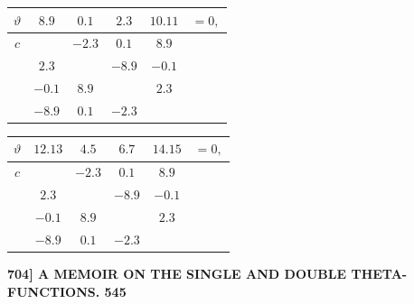 \documentclass[11pt]{article}
\begin{document}
{\smallskip
\begin{center}
\begin{tabular}{c|cccc|c}\hline
$\vartheta$ & $8.9$ & $0.1$ & $2.3$ & $10.11$ & $=0,$\\\hline
$c$ & & $-2.3$ & $0.1$ & $8.9$ & \\
& $2.3$ & & $-8.9$ & $-0.1$ & \\
& $-0.1$ & $8.9$ & & $2.3$ & \\
& $-8.9$ & $0.1$ & $-2.3$ & & \\\hline
\end{tabular}
\hspace{0.8em}
\begin{tabular}{c|cccc|c}\hline
$\vartheta$ & $12.13$ & $4.5$ & $6.7$ & $14.15$ & $=0,$\\\hline
$c$ & & $-2.3$ & $0.1$ & $8.9$ & \\
& $2.3$ & & $-8.9$ & $-0.1$ & \\
& $-0.1$ & $8.9$ & & $2.3$ & \\
& $-8.9$ & $0.1$ & $-2.3$ & & \\\hline
\end{tabular}
\end{center}
}

\newpage
\noindent\textbf{704] \quad A MEMOIR ON THE SINGLE AND DOUBLE THETA-FUNCTIONS. \hfill 545}
\end{document}
